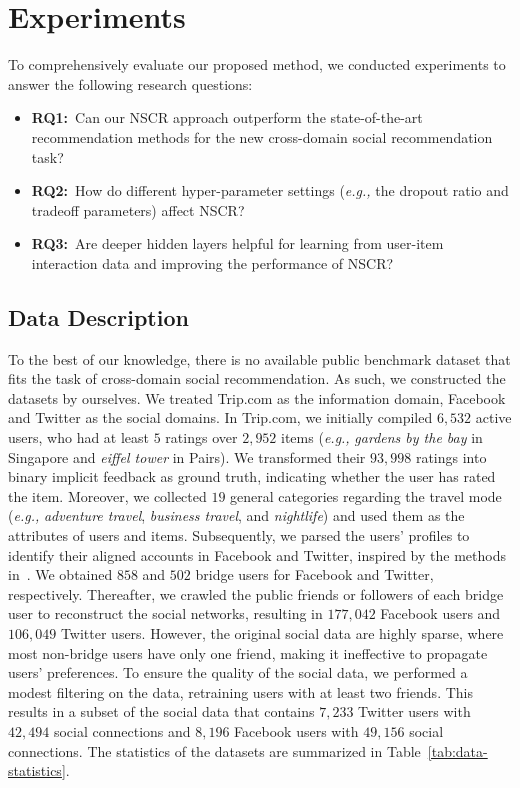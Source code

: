 \documentclass[sigconf]{acmart}
\newcommand{\eg}{\emph{e.g., }}
\begin{document}
\section{Experiments}
\label{sec:experiments}
To comprehensively evaluate our proposed method, we conducted experiments to answer the following research questions:
\begin{itemize}[leftmargin=*]
	\item\textbf{RQ1:}~Can our NSCR approach outperform the state-of-the-art recommendation methods for the new cross-domain social recommendation task?
	\item\textbf{RQ2:}~How do different hyper-parameter settings (\eg the dropout ratio and tradeoff parameters) affect NSCR?
	\item\textbf{RQ3:}~Are deeper hidden layers helpful for learning from user-item interaction data and improving the performance of NSCR?
\end{itemize}


\subsection{Data Description}

	To the best of our knowledge, there is no available public benchmark dataset that
	fits the task of cross-domain social recommendation. As such, we constructed the datasets by ourselves. We treated Trip.com as the information domain, Facebook and Twitter as the social domains. In Trip.com, we initially compiled $6,532$ active users, who had at least $5$ ratings over $2,952$ items (\eg \emph{gardens by the bay} in Singapore and \emph{eiffel tower} in Pairs). We transformed their $93,998$ ratings into binary implicit feedback as ground truth, indicating whether the user has rated the item.
	Moreover, we collected $19$ general categories regarding the travel mode (\eg \emph{adventure travel}, \emph{business travel}, and \emph{nightlife}) and used them as the attributes of users and items.
Subsequently, we parsed the users' profiles to identify their aligned accounts in Facebook and Twitter, inspired by the methods in~\cite{DBLP:series/synthesis/2016NieSC,DBLP:conf/sigir/SongNZAC15}.
	We obtained $858$ and $502$ bridge users for Facebook and Twitter, respectively. Thereafter, we crawled the public friends or followers of each bridge user to reconstruct the social networks, resulting in $177,042$ Facebook users and $106,049$ Twitter users.
	However, the original social data are highly sparse, where most non-bridge users have only one friend, making it ineffective to propagate users' preferences.
To ensure the quality of the social data,
	we performed a modest filtering on the data, retraining users with at least two friends.
This results in a subset of the social data that contains $7,233$ Twitter users with $42,494$ social connections and $8,196$ Facebook users with $49,156$ social connections. The statistics of the datasets are summarized in Table~\ref{tab:data-statistics}.
	
\end{document}
